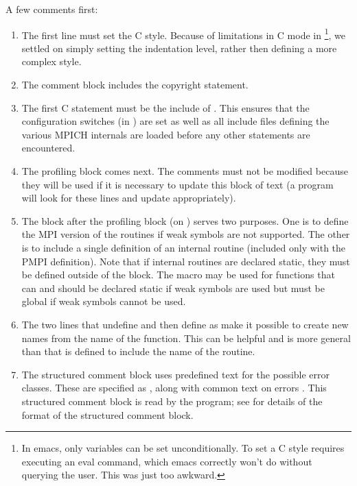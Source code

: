 \documentclass{article}
\begin{document}
A few comments first:
\begin{enumerate}
\item The first line must set the C style.  Because of limitations in
C mode in \footnote{In emacs, only variables can be set
unconditionally.  To set a C style requires executing an eval command,
which emacs correctly won't do without querying the user.  This was
just too awkward.}, we settled on simply setting the indentation
level, rather then defining a more complex style.

\item The comment block includes the copyright statement.

\item The first C statement must be the include of .  This
  ensures that the configuration switches (in ) are set as
  well as all include files defining the various MPICH internals are loaded
  before any other statements are encountered.

\item The profiling block comes next.  The comments must not be modified
  because they will be used if it is necessary to update this block of text (a
  program will look for these lines and update appropriately).

\item The block after the profiling block (on )
  serves two purposes.  One is to define the MPI version of the routines if
  weak symbols are not supported.  The other is to include a single definition
  of an internal routine (included only with the PMPI definition).
  Note that if internal routines are declared static, they must be
  defined outside of the  block.  
  The macro  may be used for
  functions that can and should be 
  declared static if weak symbols are used but must be global if weak
  symbols cannot be used.

\item The two lines that undefine  and then define
   as  make it possible to create new names
  from the name of the function.  This can be helpful and is more
  general than  that is defined to include
  the name of the routine.
  
\item The structured comment block uses predefined text for the possible error
  classes.  These are specified as , along with common text on
  errors .  This structured comment block is read by
  the  program; see \cite{doctext} for details of the
  format of the structured comment block.


\end{enumerate}
\end{document}
